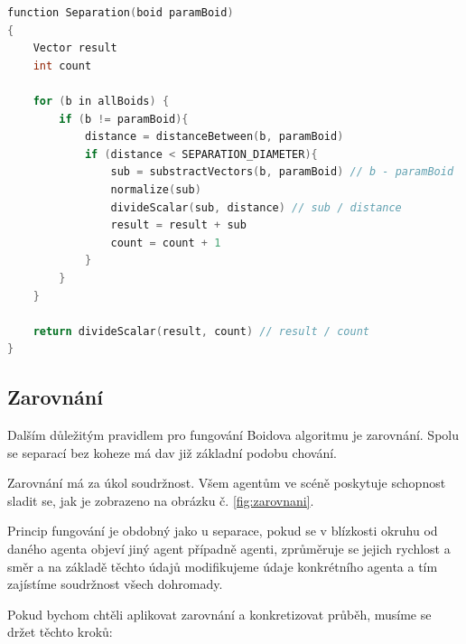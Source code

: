 \documentclass[czech,public,dept460,male,cpdeclaration]{diploma}
\begin{document}
\begin{lstlisting}[language=c++,label=src:Separation pseudocode,caption=Pseudokód pro separaci]
function Separation(boid paramBoid)
{
	Vector result
	int count
	
	for (b in allBoids) {
		if (b != paramBoid){
			distance = distanceBetween(b, paramBoid)
			if (distance < SEPARATION_DIAMETER){
				sub = substractVectors(b, paramBoid) // b - paramBoid
				normalize(sub)
				divideScalar(sub, distance) // sub / distance
				result = result + sub
				count = count + 1
			}
		}
	}
	
	return divideScalar(result, count) // result / count
}
\end{lstlisting}

\subsection{Zarovnání}\label{sec:zarovnani}
Dalším důležitým pravidlem pro fungování Boidova algoritmu je zarovnání. Spolu se separací bez koheze má dav již základní podobu chování. 

Zarovnání má za úkol soudržnost. Všem agentům ve scéně poskytuje schopnost sladit se, jak je zobrazeno na obrázku č. \ref{fig:zarovnani}. 

Princip fungování je obdobný jako u separace, pokud se v blízkosti okruhu od daného agenta objeví jiný agent případně agenti, zprůměruje se jejich rychlost a směr a na základě těchto údajů modifikujeme údaje konkrétního agenta a tím zajístíme soudržnost všech dohromady. 

Pokud bychom chtěli aplikovat zarovnání a konkretizovat průběh, musíme se držet těchto kroků:
\end{document}
